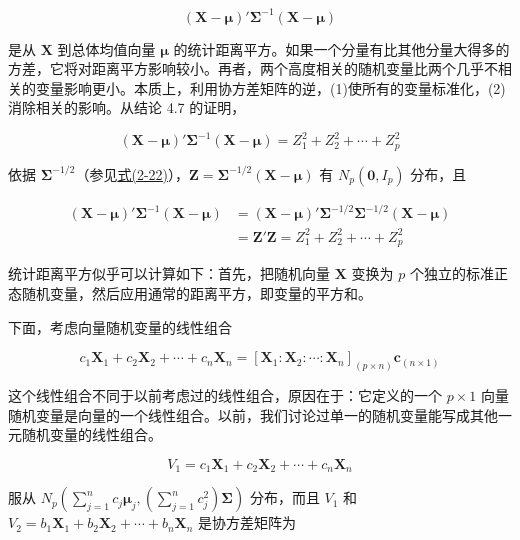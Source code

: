 \[
(\mathbf{X}-\boldsymbol{\mu})'\boldsymbol{\Sigma}^{-1}(\mathbf{X}-\boldsymbol{\mu})
\]

是从 $\mathbf{X}$ 到总体均值向量 $\boldsymbol{\mu}$ 的统计距离平方。如果一个分量有比其他分量大得多的方差，它将对距离平方影响较小。再者，两个高度相关的随机变量比两个几乎不相关的变量影响更小。本质上，利用协方差矩阵的逆，(1)使所有的变量标准化，(2)消除相关的影响。从结论 4.7 的证明，

\[
(\mathbf{X}-\boldsymbol{\mu})'\boldsymbol{\Sigma}^{-1}(\mathbf{X}-\boldsymbol{\mu})=Z_1^2+Z_2^2+\cdots+Z_p^2
\]

依据 $\boldsymbol{\Sigma}^{-1/2}$（参见\hyperref[eq:2-22]{式(2-22)}），$\mathbf{Z}=\boldsymbol{\Sigma}^{-1/2}(\mathbf{X}-\boldsymbol{\mu})$ 有 $N_p(\mathbf{0},I_p)$ 分布，且

\begin{align*}
(\mathbf{X}-\boldsymbol{\mu})'\boldsymbol{\Sigma}^{-1}(\mathbf{X}-\boldsymbol{\mu})&=(\mathbf{X}-\boldsymbol{\mu})'\boldsymbol{\Sigma}^{-1/2}\boldsymbol{\Sigma}^{-1/2}(\mathbf{X}-\boldsymbol{\mu})\\
&=\mathbf{Z}'\mathbf{Z}=Z_1^2+Z_2^2+\cdots+Z_p^2
\end{align*}

统计距离平方似乎可以计算如下：首先，把随机向量 $\mathbf{X}$ 变换为 $p$ 个独立的标准正态随机变量，然后应用通常的距离平方，即变量的平方和。

下面，考虑向量随机变量的线性组合

\label{eq:4-10}
\begin{equation}
c_1\mathbf{X}_1+c_2\mathbf{X}_2+\cdots+c_n\mathbf{X}_n=[\mathbf{X}_1:\mathbf{X}_2:\cdots:\mathbf{X}_n]_{(p\times n)}\mathbf{c}_{(n\times1)}
\tag{4-10}
\end{equation}

这个线性组合不同于以前考虑过的线性组合，原因在于：它定义的一个 $p\times1$ 向量随机变量是向量的一个线性组合。以前，我们讨论过单一的随机变量能写成其他一元随机变量的线性组合。


\[
V_1=c_1\mathbf{X}_1+c_2\mathbf{X}_2+\cdots+c_n\mathbf{X}_n
\]

服从 $N_p\left(\sum\limits_{j=1}^{n}c_j\boldsymbol{\mu}_j,\left(\sum\limits_{j=1}^{n}c_j^2\right)\boldsymbol{\Sigma}\right)$ 分布，而且 $V_1$ 和 $V_2=b_1\mathbf{X}_1+b_2\mathbf{X}_2+\cdots+b_n\mathbf{X}_n$ 是协方差矩阵为

